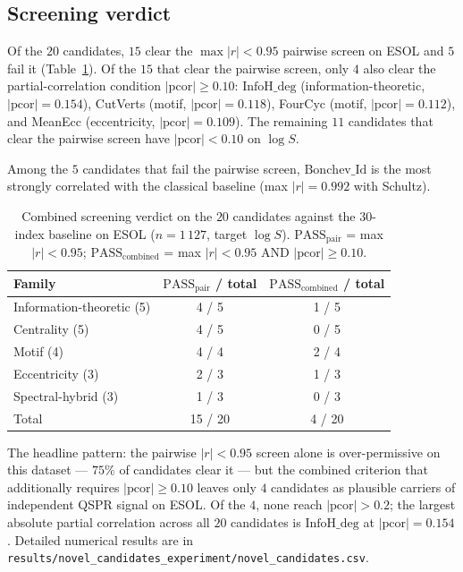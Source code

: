 \documentclass[11pt,a4paper]{article}
\theoremstyle{definition}
\begin{document}
\subsection{Screening verdict}

Of the $20$ candidates, $15$ clear the $\max|r|<0.95$ pairwise
screen on ESOL and $5$ fail it (Table~\ref{tab:novel_combined}).
Of the $15$ that clear the pairwise screen, only $4$ also clear
the partial-correlation condition $|\mathrm{pcor}|\ge 0.10$:
$\mathrm{InfoH\_deg}$ (information-theoretic, $|\mathrm{pcor}|=0.154$),
CutVerts (motif, $|\mathrm{pcor}|=0.118$),
FourCyc (motif, $|\mathrm{pcor}|=0.112$), and
MeanEcc (eccentricity, $|\mathrm{pcor}|=0.109$).
The remaining $11$ candidates that clear the pairwise screen have
$|\mathrm{pcor}|<0.10$ on $\log S$.

Among the $5$ candidates that fail the pairwise screen,
$\mathrm{Bonchev\_Id}$ is the most strongly correlated with the
classical baseline (max $|r|=0.992$ with Schultz).

\begin{table}[h]
\centering
\caption{Combined screening verdict on the $20$ candidates against the $30$-index baseline on ESOL ($n=1\,127$, target $\log S$). $\mathrm{PASS}_{\mathrm{pair}}$ = max $|r| < 0.95$; $\mathrm{PASS}_{\mathrm{combined}}$ = max $|r| < 0.95$ AND $|\mathrm{pcor}|\ge 0.10$.}
\label{tab:novel_combined}
\begin{tabular}{lcc}
\toprule
Family & $\mathrm{PASS}_{\mathrm{pair}}$ / total & $\mathrm{PASS}_{\mathrm{combined}}$ / total\\
\midrule
Information-theoretic (5) & 4 / 5 & 1 / 5\\
Centrality (5)            & 4 / 5 & 0 / 5\\
Motif (4)                 & 4 / 4 & 2 / 4\\
Eccentricity (3)          & 2 / 3 & 1 / 3\\
Spectral-hybrid (3)       & 1 / 3 & 0 / 3\\
\midrule
Total                     & 15 / 20 & 4 / 20\\
\bottomrule
\end{tabular}
\end{table}

The headline pattern: the pairwise $|r|<0.95$ screen alone is
over-permissive on this dataset --- $75\%$ of candidates clear it
--- but the combined criterion that additionally requires
$|\mathrm{pcor}|\ge 0.10$ leaves only $4$ candidates as plausible
carriers of independent QSPR signal on ESOL. Of the $4$,
none reach $|\mathrm{pcor}|>0.2$; the largest absolute partial
correlation across all $20$ candidates is $\mathrm{InfoH\_deg}$ at
$|\mathrm{pcor}|=0.154$. Detailed numerical results are in
\texttt{results/novel\_candidates\_experiment/novel\_candidates.csv}.
\end{document}
